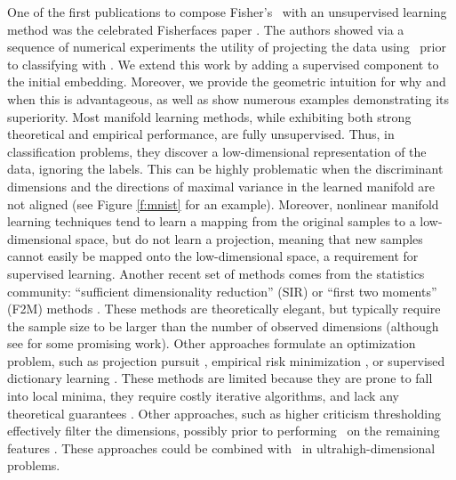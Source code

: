 \documentclass[10pt]{article}
\begin{document}
%
One of the first publications to compose Fisher's \Lda~with an unsupervised learning method was the celebrated Fisherfaces paper \cite{Belhumeur1997a}.  The authors showed via a sequence of numerical experiments the utility of projecting the data using \Pca~prior to classifying with \Lda.  We extend this work by adding a supervised component to the initial embedding.  Moreover, we provide the geometric intuition for why and when this is advantageous, as well as show numerous examples demonstrating its superiority.  %
%
Most manifold learning methods, while exhibiting both strong theoretical \cite{Eckart1936a,deSilva2003, Allard2012} and empirical performance, are fully unsupervised.  Thus, in classification problems, they discover a low-dimensional representation of the data, ignoring the labels.  This can be highly problematic when the discriminant dimensions and the directions of maximal variance in the learned manifold are not aligned (see Figure \ref{f:mnist} for an example). 
Moreover, nonlinear manifold learning techniques tend to learn a mapping from the original samples to a low-dimensional space, but do not learn a projection, meaning that new samples cannot easily be mapped onto the low-dimensional space, a requirement for supervised learning.  
%
Another recent  set of methods comes from the statistics community:   ``sufficient dimensionality reduction'' (SIR) or ``first two moments'' (F2M) methods  \cite{Li1991a, Tishby1999a, Globerson2003a, Cook2005a,Fukumizu2004a}.  These methods are theoretically elegant, but typically require the sample size to be larger than the number of observed dimensions (although see \cite{Cook2013} for some promising work).  Other approaches formulate an optimization problem, such as projection pursuit \cite{Huber1985a}, empirical risk minimization \cite{Belkin2006a}, or supervised dictionary learning \cite{Mairal2009}.  These methods are limited because they are prone to fall into local minima, they require costly iterative algorithms, and lack any theoretical guarantees \cite{Belkin2006a}.   
Other approaches, such as higher criticism thresholding \cite{Donoho2008a,} effectively filter the dimensions, possibly prior to performing \Pca~on the remaining features \cite{Bair06}. These approaches could be combined with \Lol~in ultrahigh-dimensional problems.  
\end{document}
